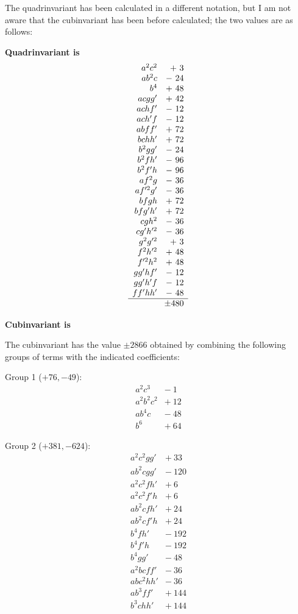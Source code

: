 \documentclass[11pt,a4paper]{article}
\begin{document}
The quadrinvariant has been calculated in a different notation, but I am not aware that the cubinvariant has been before calculated; the two values are as follows:

\medskip
\noindent\textbf{Quadrinvariant is}
\[
\begin{array}{rr}
a^2 c^2 & +\ 3\\
a b^2 c & -\ 24\\
b^4 & +\ 48\\
a c g g' & +\ 42\\
a c h f' & -\ 12\\
a c h' f & -\ 12\\
a b f f' & +\ 72\\
b c h h' & +\ 72\\
b^2 g g' & -\ 24\\
b^2 f h' & -\ 96\\
b^2 f' h & -\ 96\\
a f^2 g & -\ 36\\
a f'^2 g' & -\ 36\\
b f g h & +\ 72\\
b f g' h' & +\ 72\\
c g h^2 & -\ 36\\
c g' h'^2 & -\ 36\\
g^2 g'^2 & +\ 3\\
f^2 h'^2 & +\ 48\\
f'^2 h^2 & +\ 48\\
g g' h f' & -\ 12\\
g g' h' f & -\ 12\\
f f' h h' & -\ 48\\\hline
\multicolumn{2}{r}{\pm 480}
\end{array}
\]

\medskip
\noindent\textbf{Cubinvariant is}

The cubinvariant has the value $\pm 2866$ obtained by combining the following groups of terms with the indicated coefficients:

\smallskip
\noindent Group 1 ($+76, -49$):
\[
\begin{array}{rr}
a^2 c^3 & -\ 1\\
a^2 b^2 c^2 & +\ 12\\
a b^4 c & -\ 48\\
b^6 & +\ 64
\end{array}
\]

\noindent Group 2 ($+381, -624$):
\[
\begin{array}{rr}
a^2 c^2 g g' & +\ 33\\
a b^2 c g g' & -\ 120\\
a^2 c^2 f h' & +\ 6\\
a^2 c^2 f' h & +\ 6\\
a b^2 c f h' & +\ 24\\
a b^2 c f' h & +\ 24\\
b^4 f h' & -\ 192\\
b^4 f' h & -\ 192\\
b^4 g g' & -\ 48\\
a^2 b c f f' & -\ 36\\
a b c^2 h h' & -\ 36\\
a b^3 f f' & +\ 144\\
b^3 c h h' & +\ 144
\end{array}
\]
\end{document}
